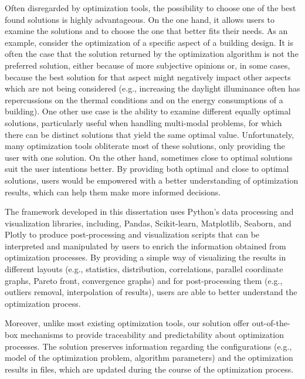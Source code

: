Often disregarded by optimization tools, the possibility to choose one of the best found solutions is highly advantageous. On the one hand, it allows users to examine the solutions and to choose the one that better fits their needs. As an example, consider the optimization of a specific aspect of a building design. It is often the case that the solution returned by the optimization algorithm is not the preferred solution, either because of more subjective opinions or, in some cases, because the best solution for that aspect might negatively impact other aspects which are not being considered (e.g., increasing the daylight illuminance often has repercussions on the thermal conditions and on the energy consumptions of a building). One other use case is the ability to examine different equally optimal solutions, particularly useful when handling multi-modal problems, for which there can be distinct solutions that yield the same optimal value. Unfortunately, many optimization tools obliterate most of these solutions, only providing the user with one solution. On the other hand, sometimes close to optimal solutions suit the user intentions better. By providing both optimal and close to optimal solutions, users would be empowered with a better understanding of optimization results, which can help them make more informed decisions. 

The framework developed in this dissertation uses Python's data processing and visualization libraries, including, Pandas, Scikit-learn, Matplotlib, Seaborn, and Plotly to produce post-processing and visualization scripts that can be interpreted and manipulated by users to enrich the information obtained from optimization processes. By providing a simple way of visualizing the results in different layouts (e.g., statistics, distribution, correlations, parallel coordinate graphs, Pareto front, convergence graphs) and for post-processing them (e.g., outliers removal, interpolation of results), users are able to better understand the optimization process. 

Moreover, unlike most existing optimization tools, our solution offer out-of-the-box mechanisms to provide traceability and predictability about optimization processes. The solution preserves information regarding the configurations (e.g., model of the optimization problem, algorithm parameters) and the optimization results in files, which are updated during the course of the optimization process. 

